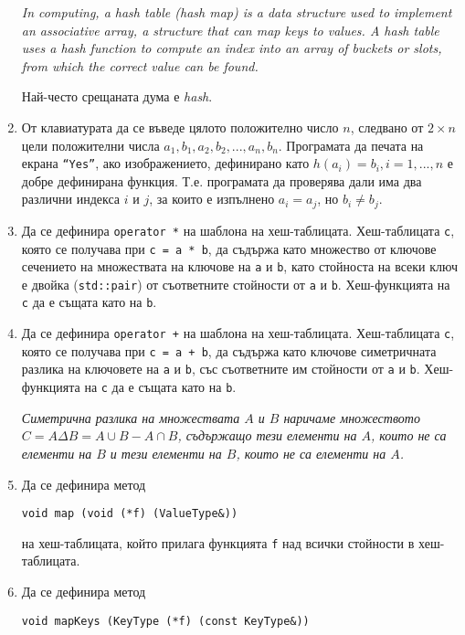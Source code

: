 \documentclass[12pt,a4paper]{article}
\begin{document}
\begin{enumerate}
	\textit{In computing, a hash table (hash map) is a data structure used to implement an associative array, a structure that can map keys to values. A hash table uses a hash function to compute an index into an array of buckets or slots, from which the correct value can be found.}

	Най-често срещаната дума е \textit{hash}.

	\item От клавиатурата да се въведе цялото положително число $n$, следвано от $2 \times n$ цели положителни числа $a_1, b_1, a_2, b_2, ..., a_n, b_n$. Програмата да печата на екрана \texttt{``Yes''}, ако изображението, дефинирано като $h(a_i)=b_i,i=1,...,n$ е добре дефинирана функция. Т.е. програмата да проверява дали има два различни индекса $i$ и $j$, за които е изпълнено $a_i=a_j$, но $b_i \neq b_j$.




		\item Да се дефинира \texttt{operator *} на шаблона на хеш-таблицата. Хеш-таблицата \texttt{c}, която се получава при \texttt{c = a * b}, да съдържа като множество от ключове сечението на множествата на ключове на \texttt{a} и \texttt{b}, като стойноста на всеки ключ е двойка (\texttt{std::pair}) от съответните стойности от \texttt{a} и \texttt{b}. Хеш-функцията на \texttt{c} да е същата като на \texttt{b}.

		\item Да се дефинира \texttt{operator +} на шаблона на хеш-таблицата. Хеш-таблицата \texttt{c}, която се получава при \texttt{c = a + b}, да съдържа като ключове симетричната разлика на ключовете на \texttt{a} и \texttt{b}, със съответните им стойности от \texttt{a} и \texttt{b}. Хеш-функцията на \texttt{c} да е същата като на \texttt{b}.

		\emph{Симетрична разлика на множествата $A$ и $B$ наричаме множеството $C = A \Delta B = A \cup B - A \cap B$, съдържащо тези елементи на $A$, които не са елементи на $B$ и тези елементи на $B$, които не са елементи на $A$.}

		\item Да се дефинира метод

		\texttt{void map (void (*f) (ValueType\&))}

		на хеш-таблицата, който прилага функцията \texttt{f} над всички стойности в хеш-таблицата.

		\item Да се дефинира метод

		\texttt{void mapKeys (KeyType (*f) (const KeyType\&))}


\end{enumerate}
\end{document}

